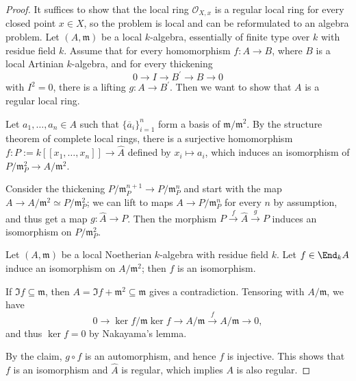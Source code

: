 \documentclass{article}
\theoremstyle{definition}
\begin{document}
\begin{proof}
It suffices to show that the local ring \(\mathcal{O}_{X,x}\) is a regular local ring for every closed point \(x\in X\), so the problem is local and can be reformulated to an algebra problem. Let \((A,\mathfrak{m})\) be a local \(k\)-algebra, essentially of finite type over \(k\) with residue field \(k\). Assume that for every homomorphism \(f:A\to B\), where \(B\) is a local Artinian \(k\)-algebra, and for every thickening
\[
0\longrightarrow I\longrightarrow B^{\prime}\longrightarrow B\longrightarrow 0
\]
with \(I^{2} = 0\), there is a lifting \(g:A\to B^{\prime}\). Then we want to show that \(A\) is a regular local ring.

Let \(a_{1},\ldots ,a_{n}\in A\) such that \(\{\overline{a}_{i}\}_{i = 1}^{n}\) form a basis of \(\mathfrak{m} / \mathfrak{m}^{2}\). By the structure theorem of complete local rings, there is a surjective homomorphism \(f:P:= k[[x_{1},\ldots ,x_{n}]]\to \widehat{A}\) defined by \(x_{i}\mapsto a_{i}\), which induces an isomorphism of \(P / \mathfrak{m}_{P}^{2}\to A / \mathfrak{m}^{2}\).

Consider the thickening \(P / \mathfrak{m}_{P}^{n+1}\to P / \mathfrak{m}_{P}^{n}\) and start with the map \(A\to A / \mathfrak{m}^{2}\simeq P / \mathfrak{m}_{P}^{2}\); we can lift to maps \(A\to P / \mathfrak{m}_{P}^{n}\) for every \(n\) by assumption, and thus get a map \(g:\widehat{A}\to P\). Then the morphism \(P\stackrel{f}{\longrightarrow}\widehat{A}\stackrel{g}{\longrightarrow}P\) induces an isomorphism on \(P / \mathfrak{m}_{P}^{2}\).

\begin{claim}
Let \((A,\mathfrak{m})\) be a local Noetherian \(k\)-algebra with residue field \(k\). Let \(f\in \End_{k}A\) induce an isomorphism on \(A / \mathfrak{m}^{2}\); then \(f\) is an isomorphism.
\end{claim}
\begin{subproof}
If \(\Im f\subseteq \mathfrak{m}\), then \(A = \Im f + \mathfrak{m}^{2}\subseteq \mathfrak{m}\) gives a contradiction. Tensoring with \(A / \mathfrak{m}\), we have
\[
0\longrightarrow \ker f / \mathfrak{m}\ker f\longrightarrow A / \mathfrak{m}\xrightarrow{f}A / \mathfrak{m}\longrightarrow 0,
\]
and thus \(\ker f = 0\) by Nakayama's lemma.
\end{subproof}
By the claim, \(g\circ f\) is an automorphism, and hence \(f\) is injective. This shows that \(f\) is an isomorphism and \(\widehat{A}\) is regular, which implies \(A\) is also regular.
\end{proof}
\end{document}
